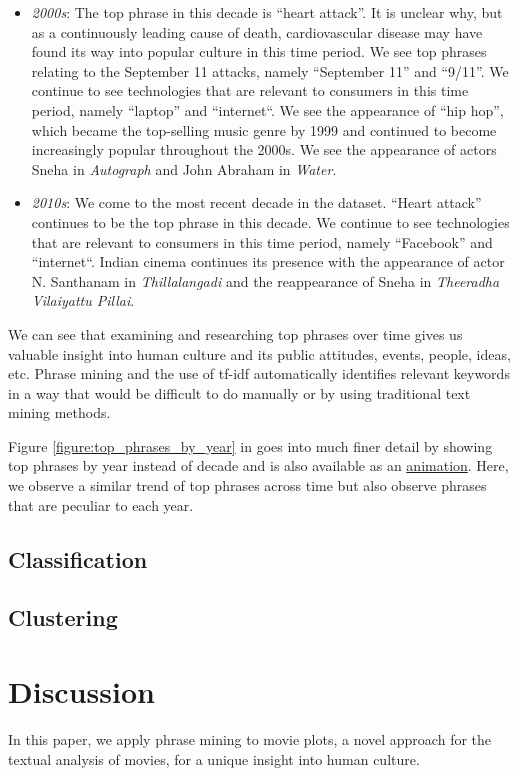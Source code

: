 \documentclass{article}
\begin{document}
\begin{multicols}{2}
\begin{itemize}
    \item \textit{2000s}: The top phrase in this decade is ``heart attack''. It is unclear why, but as a continuously leading cause of death, cardiovascular disease may have found its way into popular culture in this time period. We see top phrases relating to the September 11 attacks, namely ``September 11'' and ``9/11''. We continue to see technologies that are relevant to consumers in this time period, namely ``laptop'' and ``internet``. We see the appearance of ``hip hop'', which became the top-selling music genre by 1999 and continued to become increasingly popular throughout the 2000s. We see the appearance of actors Sneha in \textit{Autograph} and John Abraham in \textit{Water}.
    \item \textit{2010s}: We come to the most recent decade in the dataset. ``Heart attack'' continues to be the top phrase in this decade. We continue to see technologies that are relevant to consumers in this time period, namely ``Facebook'' and ``internet``. Indian cinema continues its presence with the appearance of actor N. Santhanam in \textit{Thillalangadi} and the reappearance of Sneha in \textit{Theeradha Vilaiyattu Pillai}.
\end{itemize}

We can see that examining and researching top phrases over time gives us valuable insight into human culture and its public attitudes, events, people, ideas, etc. Phrase mining and the use of tf-idf automatically identifies relevant keywords in a way that would be difficult to do manually or by using traditional text mining methods.

Figure \ref{figure:top_phrases_by_year} in  goes into much finer detail by showing top phrases by year instead of decade and is also available as an \href{https://www.youtube.com/watch?v=8aOob6iJO5Y}{animation}. Here, we observe a similar trend of top phrases across time but also observe phrases that are peculiar to each year.

\subsection{Classification}
\subsection{Clustering}

\section{Discussion} %
In this paper, we apply phrase mining to movie plots, a novel approach for the textual analysis of movies, for a unique insight into human culture.


\end{multicols}
\end{document}
